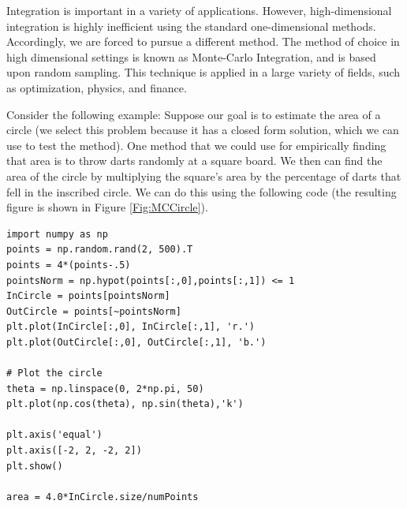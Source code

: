 
Integration is important in a variety of applications. 
However, high-dimensional integration is highly inefficient using the standard one-dimensional methods. 
Accordingly, we are forced to pursue a different method. 
The method of choice in high dimensional settings is known as Monte-Carlo Integration, and is based upon random sampling. 
This technique is applied in a large variety of fields, such as optimization, physics, and finance.

Consider the following example: Suppose our goal is to estimate the area of a circle (we select this problem because it has a closed form solution, which we can use to test the method). 
One method that we could use for empirically finding that area is to throw darts randomly at a square board.
We then can find the area of the circle by multiplying the square's area by the percentage of darts that fell in the inscribed circle. 
We can do this using the following code (the resulting figure is shown in Figure \ref{Fig:MCCircle}).

\begin{lstlisting}
import numpy as np
points = np.random.rand(2, 500).T
points = 4*(points-.5)
pointsNorm = np.hypot(points[:,0],points[:,1]) <= 1
InCircle = points[pointsNorm]
OutCircle = points[~pointsNorm]
plt.plot(InCircle[:,0], InCircle[:,1], 'r.')
plt.plot(OutCircle[:,0], OutCircle[:,1], 'b.')

# Plot the circle
theta = np.linspace(0, 2*np.pi, 50)
plt.plot(np.cos(theta), np.sin(theta),'k')

plt.axis('equal')
plt.axis([-2, 2, -2, 2])
plt.show()

area = 4.0*InCircle.size/numPoints
\end{lstlisting}

